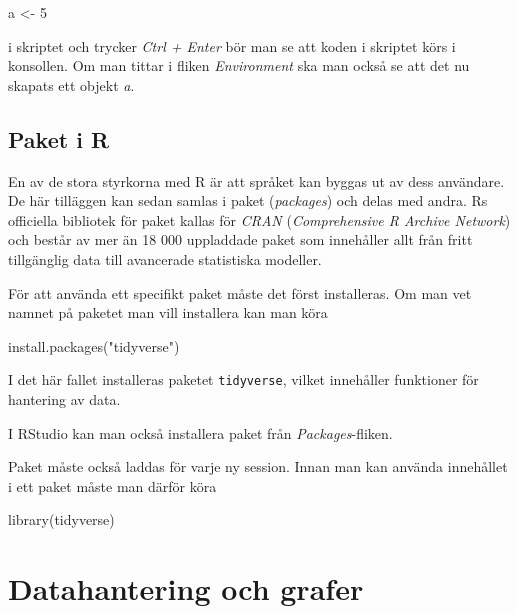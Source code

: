 \documentclass[
]{book}
\newenvironment{Shaded}{\begin{snugshade}}{\end{snugshade}}
\newcommand{\DecValTok}[1]{\textcolor[rgb]{0.00,0.00,0.81}{#1}}
\newcommand{\FunctionTok}[1]{\textcolor[rgb]{0.00,0.00,0.00}{#1}}
\newcommand{\NormalTok}[1]{#1}
\newcommand{\OtherTok}[1]{\textcolor[rgb]{0.56,0.35,0.01}{#1}}
\newcommand{\StringTok}[1]{\textcolor[rgb]{0.31,0.60,0.02}{#1}}
\theoremstyle{definition}
\theoremstyle{definition}
\theoremstyle{definition}
\theoremstyle{definition}
\theoremstyle{remark}
\begin{document}
\begin{Shaded}
\begin{Highlighting}[]
\NormalTok{a }\OtherTok{\textless{}{-}} \DecValTok{5}
\end{Highlighting}
\end{Shaded}

i skriptet och trycker \emph{Ctrl + Enter} bör man se att koden i skriptet körs i konsollen. Om man tittar i fliken \emph{Environment} ska man också se att det nu skapats ett objekt \emph{a}.

\hypertarget{paket-i-r}{%
\section{Paket i R}\label{paket-i-r}}

En av de stora styrkorna med R är att språket kan byggas ut av dess användare. De här tilläggen kan sedan samlas i paket (\emph{packages}) och delas med andra. Rs officiella bibliotek för paket kallas för \emph{CRAN} (\emph{Comprehensive R Archive Network}) och består av mer än 18 000 uppladdade paket som innehåller allt från fritt tillgänglig data till avancerade statistiska modeller.

För att använda ett specifikt paket måste det först installeras. Om man vet namnet på paketet man vill installera kan man köra

\begin{Shaded}
\begin{Highlighting}[]
\FunctionTok{install.packages}\NormalTok{(}\StringTok{"tidyverse"}\NormalTok{)}
\end{Highlighting}
\end{Shaded}

I det här fallet installeras paketet \texttt{tidyverse}, vilket innehåller funktioner för hantering av data.

I RStudio kan man också installera paket från \emph{Packages}-fliken.

Paket måste också laddas för varje ny session. Innan man kan använda innehållet i ett paket måste man därför köra

\begin{Shaded}
\begin{Highlighting}[]
\FunctionTok{library}\NormalTok{(tidyverse)}
\end{Highlighting}
\end{Shaded}

\hypertarget{datahantering-och-grafer}{%
\chapter{Datahantering och grafer}\label{datahantering-och-grafer}}
\end{document}
